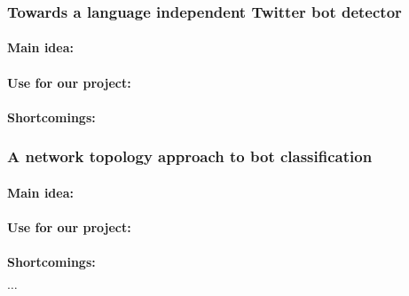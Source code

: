 \subsubsection{Towards a language independent Twitter bot detector}

\paragraph{Main idea:}
\cite{lundberg2019towards}

\paragraph{Use for our project:}

\paragraph{Shortcomings:}

\subsubsection{A network topology approach to bot classification}

\paragraph{Main idea:}
\cite{cornelissen2018network}

\paragraph{Use for our project:}

\paragraph{Shortcomings:}
$\ldots$

